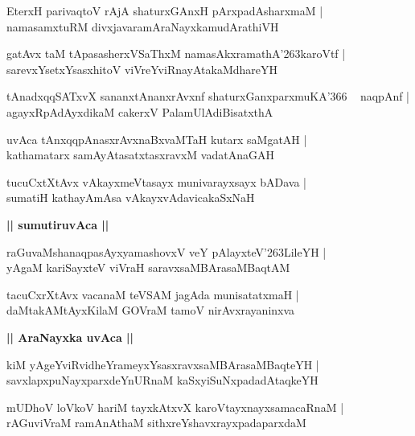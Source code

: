\documentclass[twoside,12pt,openright]{book}
\def\S{\char'263}
\newcounter{shloka}[chapter]
\def\uvaca#1{\centerline{{\large\textbf{#1}}}}
\begin{document}
\begin{shloka}%
EterxH parivaqtoV rAjA shaturxGAnxH pArxpadAsharxmaM |\\
namasamxtuRM divxjavaramAraNayxkamudArathiVH
\end{shloka}

\begin{shloka}%
gatAvx taM tApasasherxVSaThxM namasAkxramathA\S karoVtf |\\
sarevxYsetxYsasxhitoV viVreYviRnayAtakaMdhareYH 
\end{shloka}

\begin{shloka}%
tAnadxqqSATxvX sananxtAnanxrAvxnf shaturxGanxparxmuKA\char'366 ~ naqpAnf |\\
agayxRpAdAyxdikaM cakerxV PalamUlAdiBisatxthA 
\end{shloka}

\begin{shloka}%
uvAca tAnxqqpAnasxrAvxnaBxvaMTaH kutarx saMgatAH |\\
kathamatarx samAyAtasatxtasxravxM vadatAnaGAH 
\end{shloka}

\begin{shloka}%
tucuCxtXtAvx vAkayxmeVtasayx munivarayxsayx bADava |\\
sumatiH kathayAmAsa vAkayxvAdavicakaSxNaH 
\end{shloka}

\uvaca{|| sumutiruvAca ||}

\begin{shloka}%
raGuvaMshanaqpasAyxyamashovxV veY pAlayxteV\S LileYH |\\
yAgaM kariSayxteV viVraH saravxsaMBArasaMBaqtAM 
\end{shloka}

\begin{shloka}%
tacuCxrXtAvx vacanaM teVSAM jagAda munisatatxmaH |\\
daMtakAMtAyxKilaM GOVraM tamoV nirAvxrayaninxva
\end{shloka}

\uvaca{|| AraNayxka uvAca ||}

\begin{shloka}%
kiM yAgeYviRvidheYrameyxYsasxravxsaMBArasaMBaqteYH |\\
savxlapxpuNayxparxdeYnURnaM kaSxyiSuNxpadadAtaqkeYH
\end{shloka}

\begin{shloka}%
 mUDhoV loVkoV hariM tayxkAtxvX karoVtayxnayxsamacaRnaM |\\
rAGuviVraM ramAnAthaM sithxreYshavxrayxpadaparxdaM
\end{shloka}
\end{document}
